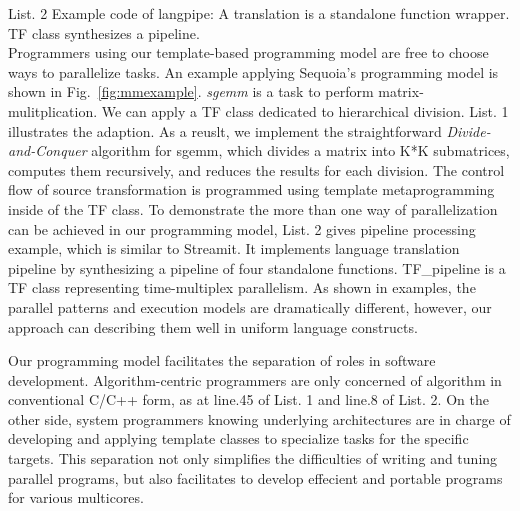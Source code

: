 List. 2  Example code of langpipe: A translation is a standalone
function wrapper. TF class synthesizes a pipeline. \\

Programmers using our template-based programming model are free to
choose ways to parallelize tasks. An example applying 
Sequoia's programming model is shown in Fig.~\ref{fig:mmexample}. 
\textit{sgemm} is a task to perform matrix-mulitplication. 
We can apply a TF class dedicated to hierarchical division.  List. 1
illustrates the adaption. As a reuslt, we
implement the straightforward \emph{Divide-and-Conquer} algorithm for
sgemm, which divides a matrix into K*K
submatrices, computes them recursively, and reduces the results for
each division.
The control flow of source transformation is programmed
using template metaprogramming inside of the TF class. 
To demonstrate the more than one way of parallelization can be
achieved in our programming model, List. 2 gives pipeline processing example, which is similar to Streamit. It implements language translation pipeline by
synthesizing a pipeline of four standalone functions. TF\_pipeline is a TF class
representing time-multiplex parallelism. As shown in examples,
the parallel patterns and execution models are dramatically
different, however, our approach can describing them well in uniform
language constructs.

Our programming model facilitates the separation of roles in software
development. Algorithm-centric programmers are only concerned of algorithm
in conventional C/C++ form, as at line.45 of List. 1 and line.8 of
List. 2. On the other side,  system programmers knowing underlying
architectures are in charge of developing and
applying template classes to specialize tasks for the specific
targets. This separation not only simplifies the difficulties of writing and
tuning parallel programs, but also facilitates to develop effecient and
portable programs for various multicores.


